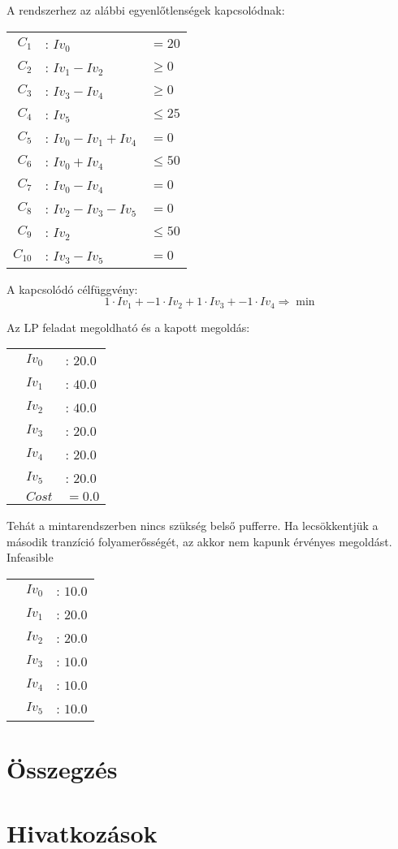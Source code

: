 \documentclass[12pt,a4paper]{book}
\begin{document}
A rendszerhez az alábbi egyenlőtlenségek kapcsolódnak:

\begin{center}
\begin{tabular}{rll}
$C_1$ &: $Iv_0$ &$= 20$ \\
$C_2$ &: $Iv_1 - Iv_2$ &$\geq 0$\\
$C_3$ &: $Iv_3 - Iv_4$ &$\geq 0$\\
$C_4$ &: $Iv_5$ &$\leq 25$\\
$C_5$ &: $Iv_0 - Iv_1 + Iv_4$ &$= 0$\\
$C_6$ &: $Iv_0 + Iv_4 $&$\leq 50$\\
$C_7$ &: $Iv_0 - Iv_4 $&$= 0$\\
$C_8$ &: $Iv_2 - Iv_3 - Iv_5$&$= 0$\\
$C_9$ &: $Iv_2 $&$\leq 50$\\
$C_{10}$ &: $Iv_3 - Iv_5 $&$= 0$
\end{tabular}
\end{center}

A kapcsolódó célfüggvény:
$$1\cdot Iv_1 + -1\cdot Iv_2 + 1\cdot Iv_3 + -1\cdot Iv_4\Rightarrow \min$$

Az LP feladat megoldható és a kapott megoldás:
\begin{center}
\begin{tabular}{rll}
&$Iv_0$ &: $20.0$\\
&$Iv_1$ &: $40.0$\\
&$Iv_2$ &: $40.0$\\
&$Iv_3$ &: $20.0$\\
&$Iv_4$ &: $20.0$\\
&$Iv_5$ &: $20.0$\\
&$Cost$ & $= 0.0$
\end{tabular}
\end{center}
Tehát a mintarendszerben nincs szükség belső pufferre. 
Ha lecsökkentjük a második tranzíció folyamerősségét, az akkor nem kapunk érvényes megoldást. \\
Infeasible
\begin{center}
\begin{tabular}{rll}
&$Iv_0$ &: $10.0$\\
&$Iv_1$ &: $20.0$\\
&$Iv_2$ &: $20.0$\\
&$Iv_3$ &: $10.0$\\
&$Iv_4$ &: $10.0$\\
&$Iv_5$ &: $10.0$
\end{tabular}
\end{center}
\chapter{Összegzés}


\chapter{Hivatkozások}

\end{document}
